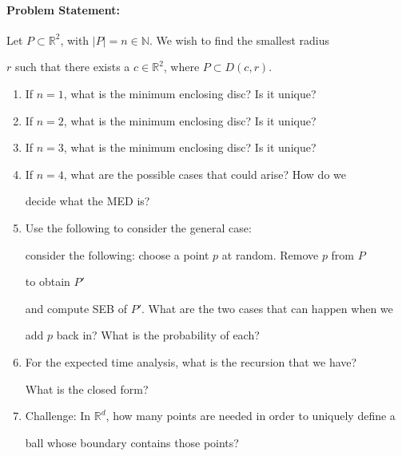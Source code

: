 \documentclass{article}
\def\R{{\mathbb R}}
\def\N{{\mathbb N}}
\begin{document}
\paragraph{Problem Statement:}



Let $P \subset \R^2$, with $|P|=n \in \N$.  We wish to find the smallest radius

$r$ such that there exists a $c \in \R^2$, where $P \subset D(c,r)$.



\begin{enumerate}

    \item If $n=1$, what is the minimum enclosing disc?  Is it unique?

        \vspace{3ex}

    \item If $n=2$, what is the minimum enclosing disc?  Is it unique?

        \vspace{3ex}

    \item If $n=3$, what is the minimum enclosing disc?  Is it unique?

        \vspace{3ex}

    \item If $n=4$, what are the possible cases that could arise?  How do we

        decide what the MED is?

        \vspace{3ex}

    \item Use the following to consider the general case:

        consider the following: choose a point $p$ at random.  Remove $p$ from $P$

        to obtain $P'$

        and compute SEB of $P'$.  What are the two cases that can happen when we

        add $p$ back in?  What is the probability of each?

        \vspace{3ex}

    \item For the expected time analysis, what is the recursion that we have?

        What is the closed form?

        \vspace{3ex}

    \item Challenge: In $\R^d$, how many points are needed in order to uniquely define a

        ball whose boundary contains those points?

        \vspace{3ex}

\end{enumerate}
\end{document}
